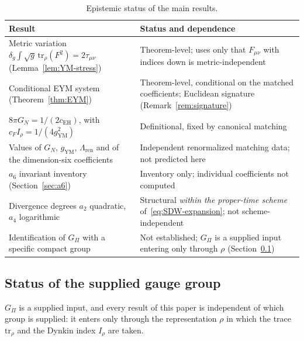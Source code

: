 \documentclass[12pt,a4paper]{article}
\theoremstyle{remark}
\begin{document}
      \begin{table}[h]
        \centering
        \renewcommand{\arraystretch}{1.2}
        \begin{tabularx}{\textwidth}{@{}>{\raggedright\arraybackslash}p{}X@{}}
          \toprule
          Result & Status and dependence \\
          \midrule
          Metric variation
          $\delta_g\!\int\!\sqrt{g}\,\mathrm{tr}_\rho(F^2) = 2\tau_{\mu\nu}$
          (Lemma~\ref{lem:YM-stress})
          & Theorem-level; uses only that $F_{\mu\nu}$ with indices down is
          metric-independent \\
          Conditional EYM system (Theorem~\ref{thm:EYM})
          & Theorem-level, conditional on the matched coefficients; Euclidean signature
          (Remark~\ref{rem:signature}) \\
          $8\pi G_N = 1/(2c_{\mathrm{EH}})$, with
          $c_F I_\rho = 1/(4g_{\mathrm{YM}}^2)$
          & Definitional, fixed by canonical matching~\cite{Beau2026h,Beau2026q12} \\
          Values of $G_N$, $g_{\mathrm{YM}}$, $\Lambda_{\mathrm{ren}}$ and of the
          dimension-six coefficients
          & Independent renormalized matching data; not predicted here \\
          $a_6$ invariant inventory (Section~\ref{sec:a6})
          & Inventory only; individual coefficients not computed~\cite{Vassilevich2003} \\
          Divergence degrees $a_2$ quadratic, $a_4$ logarithmic
          & Structural \emph{within the proper-time scheme}
          of~\eqref{eq:SDW-expansion}; not scheme-independent~\cite{Beau2026h} \\
          Identification of $G_\Pi$ with a specific compact group
          & Not established; $G_\Pi$ is a supplied input entering only through $\rho$
          (Section~\ref{ssec:Hcolor}) \\
          \bottomrule
        \end{tabularx}
        \caption{Epistemic status of the main results.}
        \label{tab:status}
      \end{table}

    \subsection{Status of the supplied gauge group}
      \label{ssec:Hcolor}

      $G_\Pi$ is a supplied input, and every result of this paper is independent of which group is
      supplied: it enters only through the representation $\rho$ in which the trace
      $\mathrm{tr}_\rho$ and the Dynkin index $I_\rho$ are taken.
\end{document}
